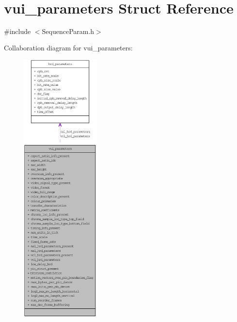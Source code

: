 \hypertarget{structvui__parameters}{
\section{vui\_\-parameters Struct Reference}
\label{structvui__parameters}
}


{\ttfamily \#include $<$SequenceParam.h$>$}



Collaboration diagram for vui\_\-parameters:\nopagebreak
\begin{figure}[H]
\begin{center}
\leavevmode
\includegraphics[height=400pt]{structvui__parameters__coll__graph}
\end{center}
\end{figure}
